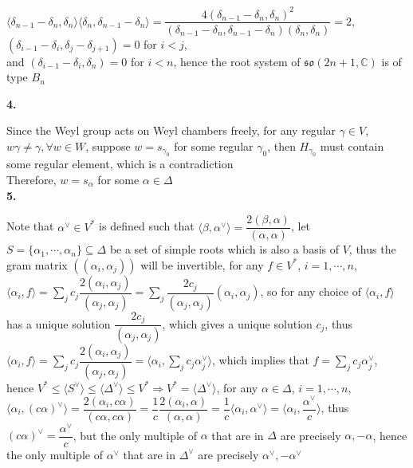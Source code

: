 \documentclass[10pt]{article}
\newcommand{\<}[1]{\langle #1 \rangle}
\begin{document}
$\langle\delta_{n-1}-\delta_n,\delta_n\rangle\langle\delta_n,\delta_{n-1}-\delta_n\rangle=\dfrac{4(\delta_{n-1}-\delta_n,\delta_n)^2}{(\delta_{n-1}-\delta_n,\delta_{n-1}-\delta_n)(\delta_n,\delta_n)}=2$, $(\delta_{i-1}-\delta_i,\delta_j-\delta_{j+1})=0$ for $i<j$, \\
and $(\delta_{i-1}-\delta_i,\delta_n)=0$ for $i<n$, hence the root system of $\mathfrak{so}(2n+1,\mathbb C)$ is of type $B_n$ \\
\begin{center}
\end{center}
\textbf{4.} \par
Since the Weyl group acts on Weyl chambers freely, for any regular $\gamma\in V$, $w\gamma\neq\gamma,\forall w\in W$, suppose $w=s_{\gamma_0}$ for some regular $\gamma_0$, then $H_{\gamma_0}$ must contain some regular element, which is a contradiction \\
Therefore, $w=s_\alpha$ for some $\alpha\in \Delta$ \\
\textbf{5.} \par
Note that $\alpha^\vee\in V^*$ is defined such that $\langle\beta,\alpha^\vee\rangle=\dfrac{2(\beta,\alpha)}{(\alpha,\alpha)}$, let $S=\{\alpha_1,\cdots,\alpha_n\}\subseteq\Delta$ be a set of simple roots which is also a basis of $V$, thus the gram matrix $((\alpha_i,\alpha_j))$ will be invertible, for any $f\in V^*$, $i=1,\cdots,n$, $\langle\alpha_i,f\rangle=\displaystyle\sum_{j}c_j\dfrac{2(\alpha_i,\alpha_j)}{(\alpha_j,\alpha_j)}=\sum_{j}\dfrac{2c_j}{(\alpha_j,\alpha_j)}(\alpha_i,\alpha_j)$, so for any choice of $\langle\alpha_i,f\rangle$ has a unique solution $\dfrac{2c_j}{(\alpha_j,\alpha_j)}$, which gives a unique solution $c_j$, thus $\langle\alpha_i,f\rangle=\displaystyle\sum_{j}c_j\dfrac{2(\alpha_i,\alpha_j)}{(\alpha_j,\alpha_j)}=\langle\alpha_i,\sum_jc_j\alpha_j^\vee\rangle$, which implies that $f=\displaystyle\sum_jc_j\alpha_j^\vee$, hence $V^*\leq\langle S^\vee\rangle\leq\langle \Delta^\vee\rangle\leq V^*\Rightarrow V^*=\langle \Delta^\vee\rangle$, for any $\alpha\in\Delta$, $i=1,\cdots,n$, $\langle\alpha_i,(c\alpha)^\vee\rangle=\dfrac{2(\alpha_i,c\alpha)}{(c\alpha,c\alpha)}=\dfrac{1}{c}\dfrac{2(\alpha_i,\alpha)}{(\alpha,\alpha)}=\dfrac{1}{c}\langle\alpha_i,\alpha^\vee\rangle=\langle\alpha_i,\dfrac{\alpha^\vee}{c}\rangle$, thus $(c\alpha)^\vee=\dfrac{\alpha^\vee}{c}$, but the only multiple of $\alpha$ that are in $\Delta$ are precisely $\alpha,-\alpha$, hence the only multiple of $\alpha^\vee$ that are in $\Delta^\vee$ are precisely $\alpha^\vee,-\alpha^\vee$ \\
\end{document}
